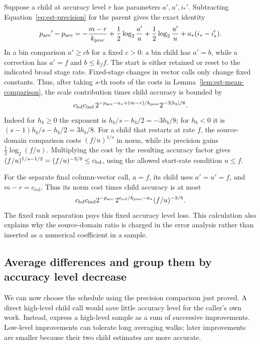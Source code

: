 \documentclass[11pt]{article}
\numberwithin{equation}{section}
\theoremstyle{definition}
\theoremstyle{remark}
\begin{document}
Suppose a child at accuracy level ${r}$ has parameters $a',u',i_*'$.  Subtracting
Equation~\eqref{eq:est-precision} for the parent gives the exact identity
\begin{equation}
 {p_{\rm acc}}'-{p_{\rm acc}}=-\frac{{m}-{r}}{{k}_{\mathrm{prec}}}
       +\frac12\log_2\frac{a'}a
       +\frac12\log_2\frac{u'}u
       +{a}_*(i_*-i_*').
 \label{eq:est-child-precision}
\end{equation}
In a bin comparison $a'\ge c b$ for a fixed $c>0$: a bin child has
$a'=b$, while a correction has $a'=f$ and $b\le {k}_f f$.
The start is either retained or reset to the indicated broad stage rate.
Fixed-stage changes in vector calls only change fixed constants.
Thus, after taking $s$-th roots of the costs in
Lemma~\ref{lem:est-mean-comparison}, the scale contribution times child
accuracy is bounded by
\begin{equation}
 {c_{\rm bd}} {c_{\rm ind}}\,2^{-{p_{\rm acc}}-{a}_*+({m}-{r})/{k}_{\mathrm{prec}}}
          2^{-3|h_b|/8}.
 \label{eq:est-scale-slack}
\end{equation}
Indeed for $h_b\ge0$ the exponent is $h_b/s-h_b/2=-3h_b/8$;
for $h_b<0$ it is $(s-1)h_b/s-h_b/2=3h_b/8$.
For a child that restarts at rate $f$, the source-domain comparison costs
$(f/u)^{1/s}$ in norm, while its precision gains
$\frac12\log_2(f/u)$.  Multiplying the cost by the resulting accuracy
factor gives
$(f/u)^{1/s-1/2}=(f/u)^{-3/8}\le {c_{\rm bd}}$, using the allowed start-rate
condition $u\le f$.

For the separate final column-vector call, $a=f$, its child uses
$a'=u'=f$, and ${m}-{r}=c_{\mathrm{col}}$.  Thus its norm cost times child
accuracy is at most
\[
 {c_{\rm bd}} {c_{\rm ind}}2^{-{p_{\rm acc}}}\,2^{c_{\mathrm{col}}/{k}_{\mathrm{prec}}-{a}_*}
       (f/u)^{-3/8}.
\]
The fixed rank separation pays this fixed accuracy level loss.  This calculation
also explains why the source-domain ratio is charged in the error
analysis rather than inserted as a numerical coefficient in a sample.

\subsection{Average differences and group them by accuracy level decrease}

We can now choose the schedule using the precision comparison just proved. A direct high-level child call would save little accuracy level for the caller's own work. Instead, express a high-level sample as a sum of successive improvements. Low-level improvements can tolerate long averaging walks; later improvements are smaller because their two child estimates are more accurate.
\end{document}

